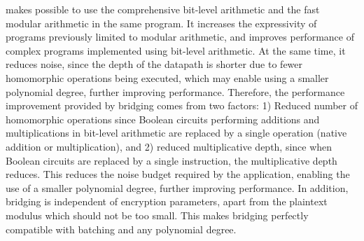 
 makes possible to use the comprehensive bit-level arithmetic and the fast modular arithmetic in the same program. It increases the expressivity of programs previously limited to modular arithmetic, and improves performance of complex programs implemented using bit-level arithmetic. At the same time, it reduces noise, since the depth of the datapath is shorter due to fewer homomorphic operations being executed, which may enable using a smaller polynomial degree, further improving performance.
Therefore, the performance improvement provided by bridging comes from two factors: 1) Reduced number of homomorphic operations since Boolean circuits performing additions and multiplications in bit-level arithmetic are replaced by a single operation (native addition or multiplication), and 2) reduced multiplicative depth, since when Boolean circuits are replaced by a single instruction, the multiplicative depth reduces. This reduces the noise budget required by the application, enabling the use of a smaller polynomial degree, further improving performance.
In addition, bridging is independent of encryption parameters, apart from the plaintext modulus which should not be too small. This makes bridging perfectly compatible with batching and any polynomial degree.

